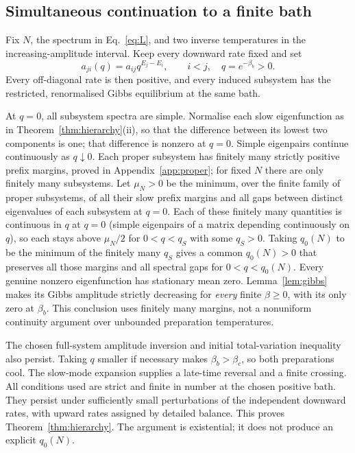 \documentclass[11pt,a4paper]{article}
\theoremstyle{remark}\newtheorem{remark}[theorem]{Remark}
\begin{document}
\subsection{Simultaneous continuation to a finite bath}
Fix $N$, the spectrum in Eq.~\eqref{eq:L}, and two inverse temperatures in the increasing-amplitude interval. Keep every downward rate fixed and set
\begin{equation}
 a_{ji}(q)=a_{ij}q^{E_j-E_i},\qquad i<j,\quad q=e^{-\beta_b}>0.
 \label{eq:finitebath}
\end{equation}
Every off-diagonal rate is then positive, and every induced subsystem has the restricted, renormalised Gibbs equilibrium at the same bath.

At $q=0$, all subsystem spectra are simple. Normalise each slow eigenfunction as in Theorem~\ref{thm:hierarchy}(ii), so that the difference between its lowest two components is one; that difference is nonzero at $q=0$. Simple eigenpairs continue continuously as $q\downarrow0$. Each proper subsystem has finitely many strictly positive prefix margins, proved in Appendix~\ref{app:proper}; for fixed $N$ there are only finitely many subsystems. Let $\mu_N>0$ be the minimum, over the finite family of proper subsystems, of all their slow prefix margins and all gaps between distinct eigenvalues of each subsystem at $q=0$. Each of these finitely many quantities is continuous in $q$ at $q=0$ (simple eigenpairs of a matrix depending continuously on $q$), so each stays above $\mu_N/2$ for $0<q<q_S$ with some $q_S>0$. Taking $q_0(N)$ to be the minimum of the finitely many $q_S$ gives a common $q_0(N)>0$ that preserves all those margins and all spectral gaps for $0<q<q_0(N)$. Every genuine nonzero eigenfunction has stationary mean zero. Lemma~\ref{lem:gibbs} makes its Gibbs amplitude strictly decreasing for \emph{every} finite $\beta\ge0$, with its only zero at $\beta_b$. This conclusion uses finitely many margins, not a nonuniform continuity argument over unbounded preparation temperatures.

The chosen full-system amplitude inversion and initial total-variation inequality also persist. Taking $q$ smaller if necessary makes $\beta_b>\beta_c$, so both preparations cool. The slow-mode expansion supplies a late-time reversal and a finite crossing. All conditions used are strict and finite in number at the chosen positive bath. They persist under sufficiently small perturbations of the independent downward rates, with upward rates assigned by detailed balance. This proves Theorem~\ref{thm:hierarchy}. The argument is existential; it does not produce an explicit $q_0(N)$.
\end{document}
